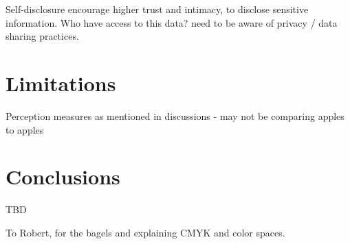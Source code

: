 \documentclass[sigconf,screen,review, anonymous]{acmart}
\newcommand{\cmt}[1]{}%
\begin{document}
Self-disclosure encourage higher trust and intimacy, to disclose sensitive information. Who have access to this data? need to be aware of privacy / data sharing practices. \cite{lee2020hear}\cmt{[23]}

\section{Limitations}

Perception measures as mentioned in discussions - may not be comparing apples to apples

\section{Conclusions}

TBD


\begin{acks}
To Robert, for the bagels and explaining CMYK and color spaces.
\end{acks}




\appendix
\end{document}
